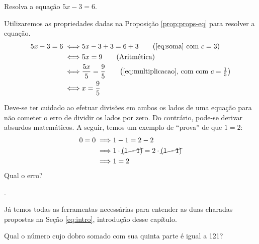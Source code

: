 \begin{example}
Resolva a equação $5x-3=6$.
\end{example}

\begin{solution}
Utilizaremos as propriedades dadas na Proposição \ref{prop:props-eq} para resolver a equação.
%
\begin{align*}
5x-3=6 \iff & 5x -3+3=6+3 \tag*{$\left(\text{\ref{eq:soma} com }c = 3\right) $}\\
		 \iff & 5x =9 \tag*{(Aritmética)}\\ 
		 \iff & \frac{5x}{5} =\frac 9 5 \tag*{$\left(\text{\ref{eq:multiplicacao}, com com } c = \frac 1 5 \right) $}\\
		 \iff & x =\frac 9 5 
\end{align*}
\end{solution}



\begin{remark}
Deve-se ter  cuidado ao efetuar divisões em ambos os lados de uma equação para não cometer o erro de dividir os lados por zero. Do contrário, pode-se derivar absurdos matemáticos. A seguir, temos um exemplo de ``prova'' de que $1=2$:
%
\begin{align*}
0=0 \implies & 1-1=2-2 \\
	\implies & 1\cdot\cancel{(1-1)}=2\cdot\cancel{(1-1)} \\
	\implies & 1=2 
\end{align*}
%
Qual o erro?
\end{remark}

\begin{onlineact}
	.
\end{onlineact}


Já temos todas as ferramentas necessárias para entender as duas charadas propostas na Seção \ref{eq:intro}, introdução desse capítulo.

\begin{example}
Qual o número cujo dobro somado com sua quinta parte é igual a 121? 
\end{example}

